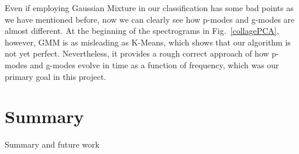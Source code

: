 \documentclass[fleqn,usenatbib]{mnras}
\begin{document}
Even if employing Gaussian Mixture in our classification has some bad points as we have mentioned before, now we can clearly see how p-modes and g-modes are almost different. At the beginning of the spectrograms in Fig.~\ref{collagePCA}, however, GMM is as misleading as K-Means, which shows that our algorithm is not yet perfect. Nevertheless, it provides a rough correct approach of how p-modes and g-modes evolve in time as a function of frequency, which was our primary goal in this project.





\section{Summary}
\label{sec:summary}
Summary and future work




\appendix





%
%
%
%




\bsp	%
\label{lastpage}
\end{document}

